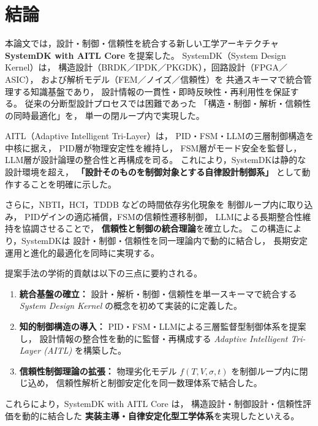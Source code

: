 \section{結論}

本論文では，設計・制御・信頼性を統合する新しい工学アーキテクチャ
\textbf{SystemDK with AITL Core} を提案した。
SystemDK（System Design Kernel）は，
構造設計（BRDK／IPDK／PKGDK），回路設計（FPGA／ASIC），
および解析モデル（FEM／ノイズ／信頼性）を
共通スキーマで統合管理する知識基盤であり，
設計情報の一貫性・即時反映性・再利用性を保証する。
従来の分断型設計プロセスでは困難であった
「構造・制御・解析・信頼性の同時最適化」を，
単一の閉ループ内で実現した。

AITL（Adaptive Intelligent Tri-Layer）は，
PID・FSM・LLMの三層制御構造を中核に据え，
PID層が物理安定性を維持し，
FSM層がモード安全を監督し，
LLM層が設計論理の整合性と再構成を司る。
これにより，SystemDKは静的な設計環境を超え，
\textbf{「設計そのものを制御対象とする自律設計制御系」}
として動作することを明確に示した。

さらに，NBTI，HCI，TDDB などの時間依存劣化現象を
制御ループ内に取り込み，
PIDゲインの適応補償，FSMの信頼性遷移制御，
LLMによる長期整合性維持を協調させることで，
\textbf{信頼性と制御の統合理論}を確立した。
この構造により，SystemDKは
設計・制御・信頼性を同一理論内で動的に結合し，
長期安定運用と進化的最適化を同時に実現する。

提案手法の学術的貢献は以下の三点に要約される。
\begin{enumerate}
  \item \textbf{統合基盤の確立：}  
  設計・解析・制御・信頼性を単一スキーマで統合する
  \emph{System Design Kernel} の概念を初めて実装的に定義した。

  \item \textbf{知的制御構造の導入：}  
  PID・FSM・LLMによる三層監督型制御体系を提案し，
  設計情報の整合性を動的に監督・再構成する
  \emph{Adaptive Intelligent Tri-Layer (AITL)} を構築した。

  \item \textbf{信頼性制御理論の拡張：}  
  物理劣化モデル $f(T,V,\sigma,t)$ を制御ループ内に閉じ込め，
  信頼性解析と制御安定化を同一数理体系で結合した。
\end{enumerate}

これらにより，SystemDK with AITL Core は，
構造設計・制御設計・信頼性評価を動的に結合した
\textbf{実装主導・自律安定化型工学体系}を実現したといえる。

